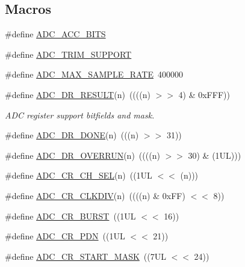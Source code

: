 \subsection*{Macros}
\begin{DoxyCompactItemize}
\item 
\#define \hyperlink{group__ADC__17XX__40XX_gaefa27b66d67f803cccaf6c1d63e93fb8}{A\-D\-C\-\_\-\-A\-C\-C\-\_\-B\-I\-T\-S}
\item 
\#define \hyperlink{group__ADC__17XX__40XX_ga5395c104e7f337e486999df0a71b105f}{A\-D\-C\-\_\-\-T\-R\-I\-M\-\_\-\-S\-U\-P\-P\-O\-R\-T}
\item 
\#define \hyperlink{group__ADC__17XX__40XX_ga00fa0a2a80f4f4e40c3f9b3bae7ba200}{A\-D\-C\-\_\-\-M\-A\-X\-\_\-\-S\-A\-M\-P\-L\-E\-\_\-\-R\-A\-T\-E}~400000
\item 
\#define \hyperlink{group__ADC__17XX__40XX_ga6e5fc80635b66a16e87c6f0eea02bb9e}{A\-D\-C\-\_\-\-D\-R\-\_\-\-R\-E\-S\-U\-L\-T}(n)~((((n) $>$$>$ 4) \& 0x\-F\-F\-F))
\begin{DoxyCompactList}\small\item\em A\-D\-C register support bitfields and mask. \end{DoxyCompactList}\item 
\#define \hyperlink{group__ADC__17XX__40XX_ga43dae5912e092ae5cd2455b69b6f4b00}{A\-D\-C\-\_\-\-D\-R\-\_\-\-D\-O\-N\-E}(n)~(((n) $>$$>$ 31))
\item 
\#define \hyperlink{group__ADC__17XX__40XX_ga48010d662d45810f9a240b29bbca5700}{A\-D\-C\-\_\-\-D\-R\-\_\-\-O\-V\-E\-R\-R\-U\-N}(n)~((((n) $>$$>$ 30) \& (1\-U\-L)))
\item 
\#define \hyperlink{group__ADC__17XX__40XX_ga3a6629b2190324c0b6abafc4b720df2e}{A\-D\-C\-\_\-\-C\-R\-\_\-\-C\-H\-\_\-\-S\-E\-L}(n)~((1\-U\-L $<$$<$ (n)))
\item 
\#define \hyperlink{group__ADC__17XX__40XX_gad2327ec652bedf37c800e077cc46d904}{A\-D\-C\-\_\-\-C\-R\-\_\-\-C\-L\-K\-D\-I\-V}(n)~((((n) \& 0x\-F\-F) $<$$<$ 8))
\item 
\#define \hyperlink{group__ADC__17XX__40XX_gac4274c705620f3ddd5ba7f73249e6248}{A\-D\-C\-\_\-\-C\-R\-\_\-\-B\-U\-R\-S\-T}~((1\-U\-L $<$$<$ 16))
\item 
\#define \hyperlink{group__ADC__17XX__40XX_ga7474e4ab5695434acbfe8a5fcad35ef0}{A\-D\-C\-\_\-\-C\-R\-\_\-\-P\-D\-N}~((1\-U\-L $<$$<$ 21))
\item 
\#define \hyperlink{group__ADC__17XX__40XX_gadb696eab756362a8e2dbc5502f8bdeaf}{A\-D\-C\-\_\-\-C\-R\-\_\-\-S\-T\-A\-R\-T\-\_\-\-M\-A\-S\-K}~((7\-U\-L $<$$<$ 24))

\end{DoxyCompactItemize}
